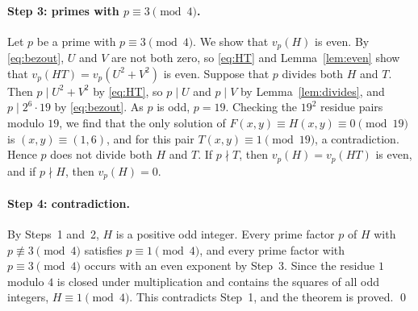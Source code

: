 \documentclass[11pt]{article}
\begin{document}
\paragraph{Step 3: primes with $p\equiv3\pmod4$.} Let $p$ be a prime with $p\equiv3\pmod4$. We show that $v_p(H)$ is even. By \eqref{eq:bezout}, $U$ and $V$ are not both zero, so \eqref{eq:HT} and Lemma~\ref{lem:even} show that $v_p(HT)=v_p(U^2+V^2)$ is even. Suppose that $p$ divides both $H$ and $T$. Then $p\mid U^2+V^2$ by \eqref{eq:HT}, so $p\mid U$ and $p\mid V$ by Lemma~\ref{lem:divides}, and $p\mid 2^6\cdot19$ by \eqref{eq:bezout}. As $p$ is odd, $p=19$. Checking the $19^2$ residue pairs modulo $19$, we find that the only solution of $F(x,y)\equiv H(x,y)\equiv0\pmod{19}$ is $(x,y)\equiv(1,6)$, and for this pair $T(x,y)\equiv1\pmod{19}$, a contradiction. Hence $p$ does not divide both $H$ and $T$. If $p\nmid T$, then $v_p(H)=v_p(HT)$ is even, and if $p\nmid H$, then $v_p(H)=0$.

\paragraph{Step 4: contradiction.} By Steps~1 and~2, $H$ is a positive odd integer. Every prime factor $p$ of $H$ with $p\not\equiv3\pmod4$ satisfies $p\equiv1\pmod4$, and every prime factor with $p\equiv3\pmod4$ occurs with an even exponent by Step~3. Since the residue $1$ modulo $4$ is closed under multiplication and contains the squares of all odd integers, $H\equiv1\pmod4$. This contradicts Step~1, and the theorem is proved.
\qed
\end{document}

